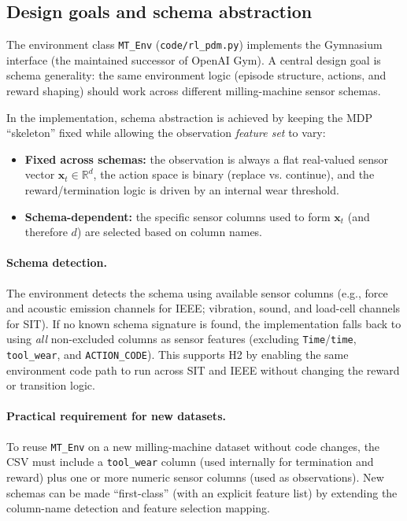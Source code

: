 \documentclass[11pt]{article}
\begin{document}
\subsection{Design goals and schema abstraction}
The environment class \texttt{MT\_Env} (\texttt{code/rl\_pdm.py}) implements the Gymnasium interface \parencite{Gymnasium2023} (the maintained successor of OpenAI Gym). A central design goal is schema generality: the same environment logic (episode structure, actions, and reward shaping) should work across different milling-machine sensor schemas.

In the implementation, schema abstraction is achieved by keeping the MDP ``skeleton'' fixed while allowing the observation \emph{feature set} to vary:
\begin{itemize}
	\item \textbf{Fixed across schemas:} the observation is always a flat real-valued sensor vector $\mathbf{x}_t\in\mathbb{R}^d$, the action space is binary (replace vs. continue), and the reward/termination logic is driven by an internal wear threshold.
	\item \textbf{Schema-dependent:} the specific sensor columns used to form $\mathbf{x}_t$ (and therefore $d$) are selected based on column names.
\end{itemize}

\paragraph{Schema detection.}
The environment detects the schema using available sensor columns (e.g., force and acoustic emission channels for IEEE; vibration, sound, and load-cell channels for SIT). If no known schema signature is found, the implementation falls back to using \emph{all} non-excluded columns as sensor features (excluding \texttt{Time}/\texttt{time}, \texttt{tool\_wear}, and \texttt{ACTION\_CODE}). This supports H2 by enabling the same environment code path to run across SIT and IEEE without changing the reward or transition logic.

\paragraph{Practical requirement for new datasets.}
To reuse \texttt{MT\_Env} on a new milling-machine dataset without code changes, the CSV must include a \texttt{tool\_wear} column (used internally for termination and reward) plus one or more numeric sensor columns (used as observations). New schemas can be made ``first-class'' (with an explicit feature list) by extending the column-name detection and feature selection mapping.
\end{document}
